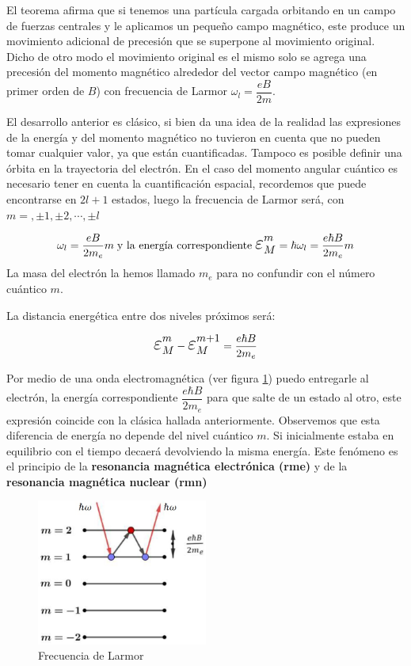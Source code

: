 El teorema afirma que si tenemos una partícula cargada orbitando en un campo de fuerzas centrales y le aplicamos un pequeño campo magnético, este produce un movimiento adicional de precesión que se superpone al movimiento original. Dicho de otro modo el movimiento original es el mismo solo se agrega una precesión del momento magnético alrededor del vector campo magnético (en primer orden de $B$) con frecuencia de Larmor $\omega_{l}=\dfrac{eB}{2m}$.

El desarrollo anterior es clásico, si bien da una idea de la realidad las expresiones de la energía y del momento magnético no tuvieron en cuenta que no pueden tomar cualquier valor, ya que están cuantificadas. Tampoco es posible definir una órbita en la trayectoria del electrón. En el caso del momento angular cuántico es necesario tener en cuenta la cuantificación espacial, recordemos que puede encontrarse en $2l+1$ estados, luego la frecuencia de Larmor será, con $m=, \pm 1, \pm 2, \cdots, \pm l$

\begin{equation}
	\omega_{l}= \dfrac{eB}{2m_{e}}m \; \text{y la energía correspondiente} \;\Bb{\varepsilon}_{M}^{m}=\hbar\omega_{l}=\dfrac{e\hbar B}{2m_{e}}m
\end{equation}
La masa del electrón la hemos llamado $m_{e}$ para no confundir con el número cuántico $m$.

La distancia energética entre dos niveles próximos será:

\begin{equation}
	\Bb{\varepsilon}_{M}^{m}-\Bb{\varepsilon}_{M}^{m+1}=\dfrac{e\hbar B}{2m_{e}}
\end{equation}

Por medio de una onda electromagnética (ver figura \ref{fig:s12}) puedo entregarle al electrón, la energía correspondiente $\dfrac{e\hbar B}{2m_{e}}$ para que salte de un estado al otro, este expresión coincide con la clásica hallada anteriormente. Observemos que esta diferencia de energía no depende del nivel cuántico $m$. Si inicialmente estaba en equilibrio con el tiempo decaerá devolviendo la misma energía. Este fenómeno es el principio de la \textbf{resonancia magnética electrónica (rme)} y de la \textbf{resonancia magnética nuclear (rmn)}

\begin{figure}[H]
    \centering
    \includegraphics[width=0.5\textwidth]{./Figures/fig_s12}
	\caption{Frecuencia de Larmor}
	\label{fig:s12}
\end{figure}


